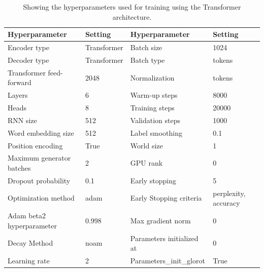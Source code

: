 \begin{table}[h]
\caption{Showing the hyperparameters used for training using the Transformer architecture.}
\centering
\begin{tabular}{|ll|ll|}
\hline
\multicolumn{1}{|l|}{Hyperparameter} & Setting     & \multicolumn{1}{l|}{Hyperparameter} & Setting              \\ \hline
Encoder type                    & Transformer & Batch size                     & 1024                 \\
Decoder type                    & Transformer & Batch type                     & tokens               \\
Transformer feed-forward        & 2048        & Normalization                  & tokens               \\
Layers                          & 6           & Warm-up steps                  & 8000                 \\
Heads                           & 8           & Training steps                 & 20000                \\
RNN size                        & 512         & Validation steps               & 1000                 \\
Word embedding size             & 512         & Label smoothing                & 0.1                  \\
Position encoding               & True        & World size                     & 1                    \\
Maximum generator batches       & 2           & GPU rank                       & 0                    \\
Dropout probability             & 0.1         & Early stopping                 & 5                    \\
Optimization method             & adam        & Early Stopping criteria        & perplexity, accuracy \\
Adam beta2 hyperparameter            & 0.998       & Max gradient norm              & 0                    \\
Decay Method                    & noam        & Parameters initialized at      & 0                    \\
Learning rate                   & 2           & Parameters\_init\_glorot       & True                 \\ \hline
\end{tabular}

\label{tab:parameter}
\end{table}

